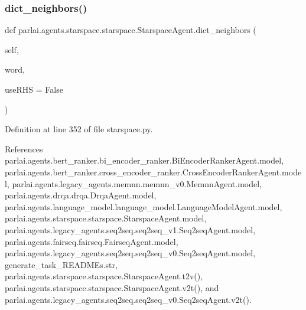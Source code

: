 \subsubsection{\texorpdfstring{dict\+\_\+neighbors()}{dict\_neighbors()}}
{\footnotesize\ttfamily def parlai.\+agents.\+starspace.\+starspace.\+Starspace\+Agent.\+dict\+\_\+neighbors (\begin{DoxyParamCaption}\item[{}]{self,  }\item[{}]{word,  }\item[{}]{use\+R\+HS = {\ttfamily False} }\end{DoxyParamCaption})}



Definition at line 352 of file starspace.\+py.



References parlai.\+agents.\+bert\+\_\+ranker.\+bi\+\_\+encoder\+\_\+ranker.\+Bi\+Encoder\+Ranker\+Agent.\+model, parlai.\+agents.\+bert\+\_\+ranker.\+cross\+\_\+encoder\+\_\+ranker.\+Cross\+Encoder\+Ranker\+Agent.\+model, parlai.\+agents.\+legacy\+\_\+agents.\+memnn.\+memnn\+\_\+v0.\+Memnn\+Agent.\+model, parlai.\+agents.\+drqa.\+drqa.\+Drqa\+Agent.\+model, parlai.\+agents.\+language\+\_\+model.\+language\+\_\+model.\+Language\+Model\+Agent.\+model, parlai.\+agents.\+starspace.\+starspace.\+Starspace\+Agent.\+model, parlai.\+agents.\+legacy\+\_\+agents.\+seq2seq.\+seq2seq\+\_\+v1.\+Seq2seq\+Agent.\+model, parlai.\+agents.\+fairseq.\+fairseq.\+Fairseq\+Agent.\+model, parlai.\+agents.\+legacy\+\_\+agents.\+seq2seq.\+seq2seq\+\_\+v0.\+Seq2seq\+Agent.\+model, generate\+\_\+task\+\_\+\+R\+E\+A\+D\+M\+Es.\+str, parlai.\+agents.\+starspace.\+starspace.\+Starspace\+Agent.\+t2v(), parlai.\+agents.\+starspace.\+starspace.\+Starspace\+Agent.\+v2t(), and parlai.\+agents.\+legacy\+\_\+agents.\+seq2seq.\+seq2seq\+\_\+v0.\+Seq2seq\+Agent.\+v2t().

